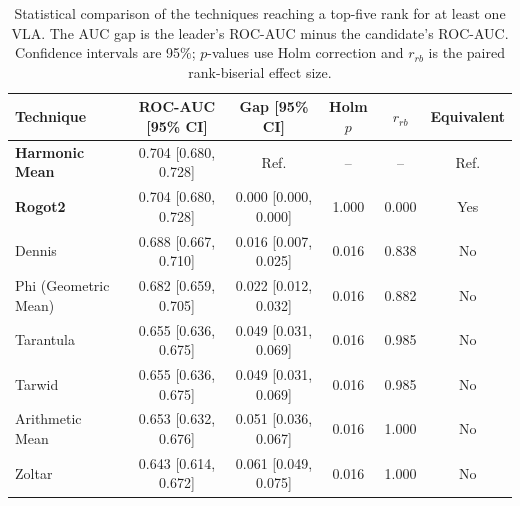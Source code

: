 \begin{table}[t]
\centering
\caption{Statistical comparison of the techniques reaching a top-five rank for at least one VLA. The AUC gap is the leader's ROC-AUC minus the candidate's ROC-AUC. Confidence intervals are 95\%; $p$-values use Holm correction and $r_{rb}$ is the paired rank-biserial effect size.}
\label{tab:rq1-competitive-statistics}
{\scriptsize
\setlength{\tabcolsep}{4pt}
\begin{tabular}{lccccc}
\toprule
Technique & ROC-AUC [95\% CI] & Gap [95\% CI] & Holm $p$ & $r_{rb}$ & Equivalent \\
\midrule
\textbf{Harmonic Mean} & 0.704 [0.680, 0.728] & Ref. & -- & -- & Ref. \\
\textbf{Rogot2} & 0.704 [0.680, 0.728] & 0.000 [0.000, 0.000] & 1.000 & 0.000 & Yes \\
Dennis & 0.688 [0.667, 0.710] & 0.016 [0.007, 0.025] & 0.016 & 0.838 & No \\
Phi (Geometric Mean) & 0.682 [0.659, 0.705] & 0.022 [0.012, 0.032] & 0.016 & 0.882 & No \\
Tarantula & 0.655 [0.636, 0.675] & 0.049 [0.031, 0.069] & 0.016 & 0.985 & No \\
Tarwid & 0.655 [0.636, 0.675] & 0.049 [0.031, 0.069] & 0.016 & 0.985 & No \\
Arithmetic Mean & 0.653 [0.632, 0.676] & 0.051 [0.036, 0.067] & 0.016 & 1.000 & No \\
Zoltar & 0.643 [0.614, 0.672] & 0.061 [0.049, 0.075] & 0.016 & 1.000 & No \\
\bottomrule
\end{tabular}
}
\end{table}
